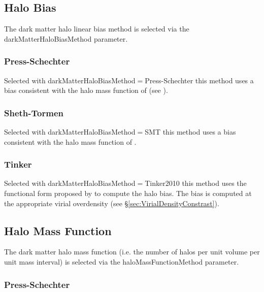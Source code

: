 \subsection{Halo Bias}

The dark matter halo linear bias method is selected via the {\normalfont \ttfamily darkMatterHaloBiasMethod} parameter.

\subsubsection{Press-Schechter}

Selected with {\normalfont \ttfamily darkMatterHaloBiasMethod}$=${\normalfont \ttfamily Press-Schechter} this method uses a bias consistent with the halo mass function of \cite{press_formation_1974} (see \citep{mo_analytic_1996}).

\subsubsection{Sheth-Tormen}

Selected with {\normalfont \ttfamily darkMatterHaloBiasMethod}$=${\normalfont \ttfamily SMT} this method uses a bias consistent with the halo mass function of \cite{sheth_ellipsoidal_2001}.

\subsubsection{Tinker}

Selected with {\normalfont \ttfamily darkMatterHaloBiasMethod}$=${\normalfont \ttfamily Tinker2010} this method uses the functional form proposed by \cite{tinker_large_2010} to compute the halo bias. The bias is computed at the appropriate virial overdensity (see \S\ref{sec:VirialDensityConstrast}).

\subsection{Halo Mass Function}

The dark matter halo mass function (i.e. the number of halos per unit volume per unit mass interval) is selected via the {\normalfont \ttfamily haloMassFunctionMethod} parameter.

\subsubsection{Press-Schechter}\label{phys:haloMassFunction:haloMassFunctionPressSchechter}

